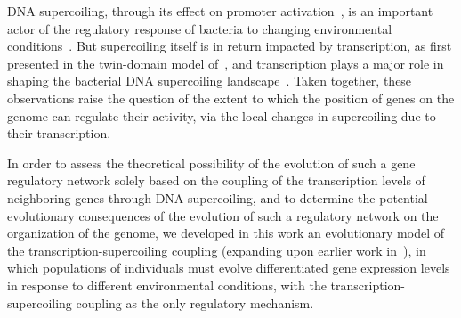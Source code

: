 DNA supercoiling, through its effect on promoter activation~\citep{forquet2021}, is an important actor of the regulatory response of bacteria to changing environmental conditions~\citep{martisb.2019}.
But supercoiling itself is in return impacted by transcription, as first presented in the twin-domain model of~\cite{liu1987}, and transcription plays a major role in shaping the bacterial DNA supercoiling landscape~\citep{visser2022}.
Taken together, these observations raise the question of the extent to which the position of genes on the genome can regulate their activity, via the local changes in supercoiling due to their transcription.

In order to assess the theoretical possibility of the evolution of such a gene regulatory network solely based on the coupling of the transcription levels of neighboring genes through DNA supercoiling, and to determine the potential evolutionary consequences of the evolution of such a regulatory network on the organization of the genome, we developed in this work an evolutionary model of the transcription-supercoiling coupling (expanding upon earlier work in~\cite{grohens2021}), in which populations of individuals must evolve differentiated gene expression levels in response to different environmental conditions, with the transcription-supercoiling coupling as the only regulatory mechanism.

